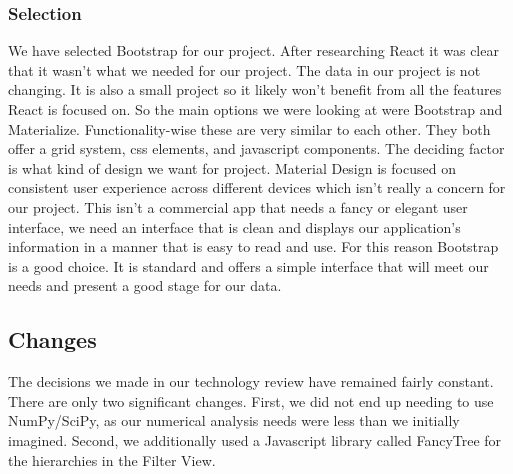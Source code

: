 \subsubsection{Selection}
We have selected Bootstrap for our project. 
After researching React it was clear that it wasn’t what we needed for our project. 
The data in our project is not changing. 
It is also a small project so it likely won’t benefit from all the features React is focused on. 
So the main options we were looking at were Bootstrap and Materialize. 
Functionality-wise these are very similar to each other. 
They both offer a grid system, css elements, and javascript components. 
The deciding factor is what kind of design we want for project. 
Material Design is focused on consistent user experience across different devices which isn’t really a concern for our project. 
This isn’t a commercial app that needs a fancy or elegant user interface, we need an interface that is clean and displays our application’s information in a manner that is easy to read and use. 
For this reason Bootstrap is a good choice. 
It is standard and offers a simple interface that will meet our needs and present a good stage for our data.


\subsection{Changes}
The decisions we made in our technology review have remained fairly constant.
There are only two significant changes.
First, we did not end up needing to use NumPy/SciPy, as our numerical analysis needs were less than we initially imagined.
Second, we additionally used a Javascript library called FancyTree for the hierarchies in the Filter View.
